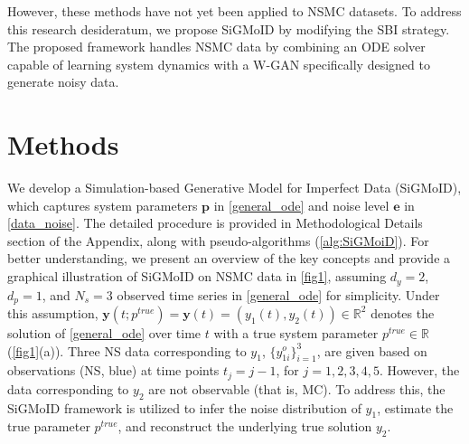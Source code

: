 \documentclass[letterpaper]{article} %
\theoremstyle{thmstyleone}%
\theoremstyle{thmstyletwo}%
\theoremstyle{thmstylethree}%
\begin{document}
However, these methods have not yet been applied to NSMC datasets. To address this research desideratum, we propose SiGMoID by modifying the SBI strategy. The proposed framework handles NSMC data by combining an ODE solver capable of learning system dynamics with a W-GAN specifically designed to generate noisy data.

\section{Methods}
We develop a Simulation-based Generative Model for Imperfect Data (SiGMoID), which captures system parameters $\mathbf{p}$ in \cref{general_ode} and noise level $\mathbf{e}$ in \cref{data_noise}. The detailed procedure is provided in Methodological Details section of the Appendix, along with pseudo-algorithms (\cref{alg:SiGMoiD}). For better understanding, we present an overview of the key concepts and provide a graphical illustration of SiGMoID on NSMC data in \cref{fig1}, assuming $d_y = 2$, $d_p = 1$, and $N_s = 3$ observed time series in \cref{general_ode} for simplicity. Under this assumption, $\mathbf{y}(t;p^{true})=\mathbf{y}(t) = (y_1(t), y_2(t)) \in \mathbb{R}^2$ denotes the solution of \cref{general_ode} over time $t$ with a true system parameter $p^{true} \in \mathbb{R}$ (\cref{fig1}(a)). Three NS data corresponding to $y_1$, $\{y_{1i}^{o}\}_{i=1}^{3}$, are given based on observations (NS, blue) at time points $t_j=j-1$, for $j=1,2,3,4,5$. However, the data corresponding to $y_{2}$ are not observable (that is, MC). To address this, the SiGMoID framework is utilized to infer the noise distribution of $y_{1}$, estimate the true parameter $p^{true}$, and reconstruct the underlying true solution $y_2$.
\end{document}
